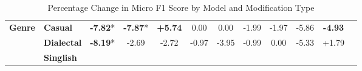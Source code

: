\begin{table}[h]
\begin{adjustbox}{max width=\linewidth}
\begin{tabular}{llcccccccccc}
\hline
\textbf{Genre} & \textbf{Casual} & \cellcolor{red!23} \textbf{-7.82}* & \cellcolor{red!23} \textbf{-7.87}* & \cellcolor{green!17} \textbf{+5.74} & \cellcolor{red!0} 0.00 & \cellcolor{red!0} 0.00 & \cellcolor{red!5} -1.99 & \cellcolor{red!5} -1.97 & \cellcolor{red!17} -5.86 & \cellcolor{red!14} \textbf{-4.93} \\
 & \textbf{Dialectal} & \cellcolor{red!24} \textbf{-8.19}* & \cellcolor{red!8} -2.69 & \cellcolor{red!8} -2.72 & \cellcolor{red!2} -0.97 & \cellcolor{red!11} -3.95 & \cellcolor{red!2} -0.99 & \cellcolor{red!0} 0.00 & \cellcolor{red!15} -5.33 & \cellcolor{green!5} +1.79 \\
 & \textbf{Singlish} &  &  &  &  &  &  &  &  &  \\
\hline
\end{tabular}
\end{adjustbox}
\caption{Percentage Change in Micro F1 Score by Model and Modification Type}
\label{tab:dialogue_results_table}
\end{table}